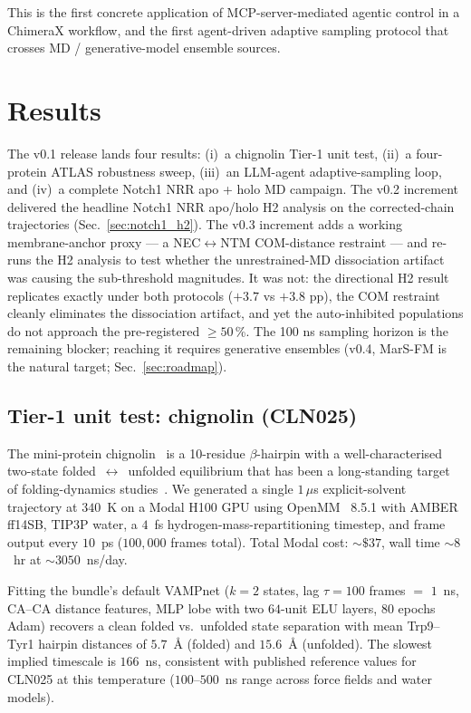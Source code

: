 \documentclass[11pt]{article}
\begin{document}
This is the first concrete application of MCP-server-mediated
agentic control in a ChimeraX workflow, and the first agent-driven
adaptive sampling protocol that crosses MD / generative-model ensemble
sources.

\section{Results}
\label{sec:results}

The v0.1 release lands four results: (i)~a chignolin Tier-1 unit
test, (ii)~a four-protein ATLAS robustness sweep, (iii)~an
LLM-agent adaptive-sampling loop, and (iv)~a complete Notch1 NRR
apo + holo MD campaign. The v0.2 increment delivered the headline
Notch1 NRR apo/holo H2 analysis on the corrected-chain
trajectories (Sec.~\ref{sec:notch1_h2}). The v0.3 increment adds
a working membrane-anchor proxy --- a NEC$\leftrightarrow$NTM
COM-distance restraint --- and re-runs the H2 analysis to test
whether the unrestrained-MD dissociation artifact was causing the
sub-threshold magnitudes. It was not: the directional H2 result
replicates exactly under both protocols ($+3.7$ vs $+3.8$ pp), the
COM restraint cleanly eliminates the dissociation artifact, and
yet the auto-inhibited populations do not approach the
pre-registered $\ge 50$\,\%. The 100 ns sampling horizon is the
remaining blocker; reaching it requires generative ensembles
(v0.4, MarS-FM is the natural target; Sec.~\ref{sec:roadmap}).

\subsection{Tier-1 unit test: chignolin (CLN025)}
\label{sec:tier1}

The mini-protein chignolin~\cite{honda2008cln025} is a 10-residue
$\beta$-hairpin with a well-characterised two-state
folded~$\leftrightarrow$~unfolded equilibrium that has been a long-standing
target of folding-dynamics studies~\cite{lindorff2011fastfolders}. We
generated a single $1\,\mu$s explicit-solvent trajectory at $340$~K on a
Modal H100 GPU using OpenMM~\cite{eastman2017openmm} 8.5.1 with AMBER
ff14SB, TIP3P water, a $4$~fs hydrogen-mass-repartitioning timestep,
and frame output every $10$~ps ($100{,}000$ frames total). Total Modal
cost: $\sim\!\$37$, wall time $\sim\!8$~hr at $\sim\!3050$~ns/day.

Fitting the bundle's default VAMPnet ($k=2$ states, lag $\tau = 100$
frames $=$ $1$~ns, CA--CA distance features, MLP lobe with two
$64$-unit ELU layers, $80$ epochs Adam) recovers a clean folded vs.\
unfolded state separation with mean Trp9--Tyr1 hairpin distances of
$5.7$~\AA{} (folded) and $15.6$~\AA{} (unfolded). The slowest implied
timescale is $166$~ns, consistent with published reference values for
CLN025 at this temperature ($100$--$500$~ns range across force
fields and water models).
\end{document}
